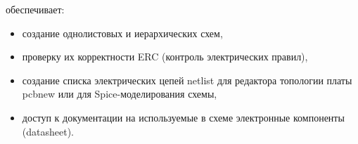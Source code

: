 
обеспечивает:

\begin{itemize}
\item создание однолистовых и иерархических схем,
\item проверку их корректности ERC (контроль электрических правил),
\item создание списка электрических цепей netlist для редактора топологии платы
pcbnew или для Spice-моделирования схемы, 
\item доступ к документации на используемые в схеме электронные компоненты
(datasheet).
\end{itemize}